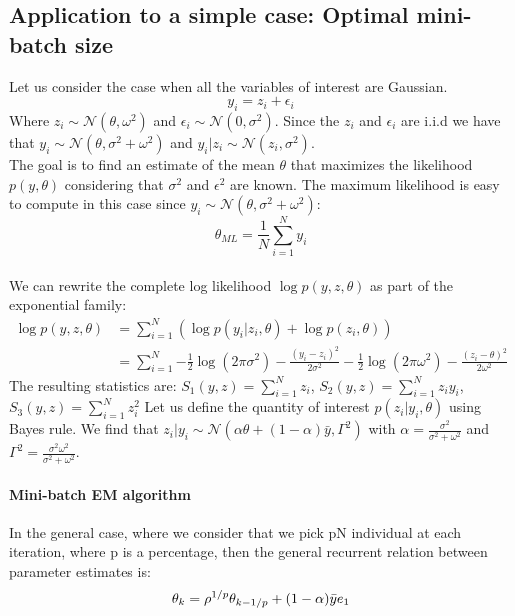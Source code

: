 \documentclass[a4paper]{article}
\theoremstyle{plain}
\theoremstyle{plain}
\theoremstyle{definition}
\begin{document}
\subsection{Application to a simple case: Optimal mini-batch size}

Let us consider the case when all the variables of interest are Gaussian.
\begin{equation}
y_i = z_i + \epsilon_i
\end{equation}
Where $z_i \sim \mathcal{N}(\theta,\omega^2)$ and $\epsilon_i \sim \mathcal{N}(0,\sigma^2)$.
Since the $z_i$ and $\epsilon_i$ are i.i.d we have that $y_i \sim \mathcal{N}(\theta,\sigma^2 + \omega^2)$ and $y_i|z_i \sim \mathcal{N}(z_i,\sigma^2)$.\\
The goal is to find an estimate of the mean $\theta$ that maximizes the likelihood $p(y,\theta)$ considering that $\sigma^2$ and $\epsilon^2$ are known. The maximum likelihood is easy to compute in this case since $y_i \sim \mathcal{N}(\theta,\sigma^2 + \omega^2)$:
\begin{equation}
\theta_{ML} = \frac{1}{N}\sum_{i=1}^{N}{y_i}
\end{equation}\\

We can rewrite the complete log likelihood $\log p(y,z,\theta)$ as part of the exponential family:
\begin{equation}
\begin{split}
\log p(y,z,\theta) & = \sum_{i=1}^{N}{(\log p(y_i|z_i,\theta) + \log p(z_i,\theta))}\\
& = \sum_{i=1}^{N}{-\frac{1}{2}\log(2\pi\sigma^2) -\frac{(y_i - z_i)^2}{2\sigma^2} -\frac{1}{2}\log(2\pi\omega^2) -\frac{(z_i - \theta)^2}{2\omega^2}}
\end{split}
\end{equation}
The resulting statistics are: $S_1(y,z) = \sum_{i=1}^{N}{z_i} $, $S_2(y,z) = \sum_{i=1}^{N}{z_iy_i} $,$S_3(y,z) = \sum_{i=1}^{N}{z_i^2} $
Let us define the quantity of interest $p(z_i|y_i,\theta)$ using Bayes rule.
We find that $z_i|y_i \sim \mathcal{N}(\alpha\theta+(1-\alpha)\bar{y}, \Gamma^2)$ with $\alpha = \frac{\sigma^2}{\sigma^2+\omega^2}$ and $\Gamma^2 = \frac{\sigma^2\omega^2}{\sigma^2+\omega^2}$.\\

\paragraph{Mini-batch EM algorithm}
In the general case, where we consider that we pick pN individual at each iteration, where p is a percentage, then the general recurrent relation between parameter estimates is:
\begin{equation}
\theta_k = \rho^{1/p} \theta_{k-1/p} + (1-\alpha) \bar{y} e_1 \\
\end{equation}
\end{document}
